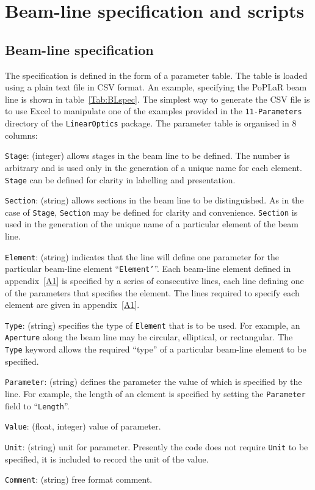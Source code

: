 \graphicspath{ {06-BLspecScrpts/Figures/} }

\section{Beam-line specification and scripts}

\subsection{Beam-line specification}

The specification is defined in the form of a parameter table.
The table is loaded using a plain text file in CSV format.
An example, specifying the PoPLaR beam line is shown in
table~\ref{Tab:BLspec}.
The simplest way to generate the CSV file is to use Excel to
manipulate one of the examples provided in the \texttt{11-Parameters}
directory of the \texttt{LinearOptics} package.
The parameter table is organised in 8 columns:
\begin{description}
  \item{\texttt{Stage}:} (integer) allows stages in the beam line to
    be defined.
    The number is arbitrary and is used only in the generation of a
    unique name for each element.
    \texttt{Stage} can be defined for clarity in labelling and
    presentation.
  \item{\texttt{Section}:} (string) allows sections in the beam line
    to be distinguished.
    As in the case of \texttt{Stage}, \texttt{Section} may be defined
    for clarity and convenience.
    \texttt{Section} is used in the generation of the unique name of a
    particular element of the beam line.
  \item{\texttt{Element}:} (string) indicates that the line will
    define one parameter for the particular beam-line element
    ``\texttt{Element'}''.
    Each beam-line element defined in appendix~\ref{A1} is specified
    by a series of consecutive lines, each line defining one of the
    parameters that specifies the element.
    The lines required to specify each element are given in
    appendix~\ref{A1}.
  \item{\texttt{Type}:} (string) specifies the type
    of \texttt{Element} that is to be used.
    For example, an \texttt{Aperture} along the beam line may be
    circular, elliptical, or rectangular.
    The \texttt{Type} keyword allows the required ``type'' of a
    particular beam-line element to be specified.
  \item{\texttt{Parameter}:} (string) defines the parameter the value
    of which is specified by the line.
    For example, the length of an element is specified by setting
    the \texttt{Parameter} field to ``\texttt{Length}''.
  \item{\texttt{Value}:} (float, integer) value of parameter.
  \item{\texttt{Unit}:} (string) unit for parameter.
    Presently the code does not require \texttt{Unit} to be
    specified, it is included to record the unit of the value.
  \item{\texttt{Comment}:} (string) free format comment.
\end{description}
